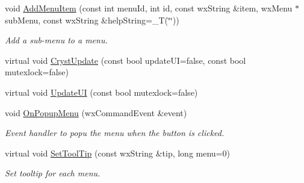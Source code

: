 \begin{DoxyCompactItemize}
\mbox{\label{class_obj_cryst_1_1_w_x_cryst_menu_bar_a8d8e212441d2df35499e13bc38c7c463}} 
void \mbox{\hyperlink{class_obj_cryst_1_1_w_x_cryst_menu_bar_a8d8e212441d2df35499e13bc38c7c463}{Add\+Menu\+Item}} (const int menu\+Id, int id, const wx\+String \&item, wx\+Menu $\ast$sub\+Menu, const wx\+String \&help\+String=\+\_\+T(\char`\"{}\char`\"{}))
\begin{DoxyCompactList}\small\item\em Add a sub-\/menu to a menu. \end{DoxyCompactList}\item 
virtual void \mbox{\hyperlink{class_obj_cryst_1_1_w_x_cryst_menu_bar_a9cdd403a3463200227c2cdda64ad0317}{Cryst\+Update}} (const bool update\+UI=false, const bool mutexlock=false)
\item 
virtual void \mbox{\hyperlink{class_obj_cryst_1_1_w_x_cryst_menu_bar_a87182041080b9726b38292547632413f}{Update\+UI}} (const bool mutexlock=false)
\item 
\mbox{\label{class_obj_cryst_1_1_w_x_cryst_menu_bar_ade8539411ad2badf7ca0d84c982d1e1e}} 
void \mbox{\hyperlink{class_obj_cryst_1_1_w_x_cryst_menu_bar_ade8539411ad2badf7ca0d84c982d1e1e}{On\+Popup\+Menu}} (wx\+Command\+Event \&event)
\begin{DoxyCompactList}\small\item\em Event handler to popu the menu when the button is clicked. \end{DoxyCompactList}\item 
\mbox{\label{class_obj_cryst_1_1_w_x_cryst_menu_bar_a22ecfb42aa781631df29d9a27db34fca}} 
virtual void \mbox{\hyperlink{class_obj_cryst_1_1_w_x_cryst_menu_bar_a22ecfb42aa781631df29d9a27db34fca}{Set\+Tool\+Tip}} (const wx\+String \&tip, long menu=0)
\begin{DoxyCompactList}\small\item\em Set tooltip for each menu. \end{DoxyCompactList}\end{DoxyCompactItemize}
